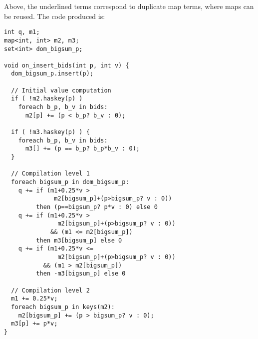Above, the underlined terms correspond to duplicate map terms, where maps can be
reused. The code produced is:

\begin{Verbatim}
int q, m1;
map<int, int> m2, m3;
set<int> dom_bigsum_p;

void on_insert_bids(int p, int v) {
  dom_bigsum_p.insert(p);

  // Initial value computation
  if ( !m2.haskey(p) )
    foreach b_p, b_v in bids:
      m2[p] += (p < b_p? b_v : 0);

  if ( !m3.haskey(p) ) {
    foreach b_p, b_v in bids:
      m3[] += (p == b_p? b_p*b_v : 0);
  }

  // Compilation level 1
  foreach bigsum_p in dom_bigsum_p:
    q += if (m1+0.25*v >
              m2[bigsum_p]+(p>bigsum_p? v : 0))
         then (p==bigsum_p? p*v : 0) else 0
    q += if (m1+0.25*v >
               m2[bigsum_p]+(p>bigsum_p? v : 0))
             && (m1 <= m2[bigsum_p])
         then m3[bigsum_p] else 0
    q += if (m1+0.25*v <=
               m2[bigsum_p]+(p>bigsum_p? v : 0))
           && (m1 > m2[bigsum_p])
         then -m3[bigsum_p] else 0

  // Compilation level 2
  m1 += 0.25*v;
  foreach bigsum_p in keys(m2):
    m2[bigsum_p] += (p > bigsum_p? v : 0);
  m3[p] += p*v;
}
\end{Verbatim}


